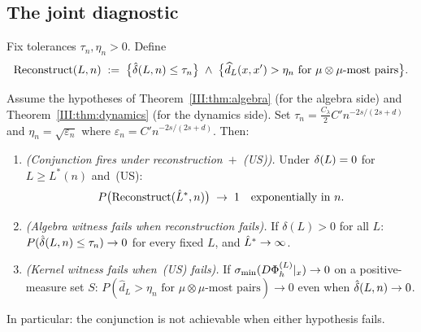 \subsection{The joint diagnostic}

\begin{definition}
\label{III:def:diagnostic}
Fix tolerances $\tau_n, \eta_n > 0$.
Define
\[
  \mathrm{Reconstruct}(L, n)
  \;:=\;
  \bigl\{\hat{\delta}(L,n) \leq \tau_n\bigr\}
  \;\wedge\;
  \bigl\{\widehat{d}_L(x,x') > \eta_n
    \text{ for $\mu \otimes \mu$-most pairs}\bigr\}.
\]
\end{definition}

\begin{theorem}
\label{III:thm:conjunction}
Assume the hypotheses of Theorem~\ref{III:thm:algebra} (for the algebra side)
and Theorem~\ref{III:thm:dynamics} (for the dynamics side).
Set $\tau_n = \frac{C_\lambda}{2} C' n^{-2s/(2s+d)}$ and
$\eta_n = \sqrt{\varepsilon_n}$ where $\varepsilon_n = C' n^{-2s/(2s+d)}$.
Then:
\begin{enumerate}[label=(\alph*)]
  \item \emph{(Conjunction fires under reconstruction~$+$~(US)).}
    Under $\delta(L) = 0$ for $L \geq L^*(n)$ and~(US):
    \[
      P\bigl(\mathrm{Reconstruct}(\hat{L}^*, n)\bigr) \;\to\; 1
      \quad\text{exponentially in } n.
    \]
  \item \emph{(Algebra witness fails when reconstruction fails).}
    If $\delta(L) > 0$ for all $L$: $P(\hat{\delta}(L,n) \leq \tau_n) \to 0$
    for every fixed $L$, and $\hat{L}^* \to \infty$.

  \item \emph{(Kernel witness fails when~(US) fails).}
    If $\sigma_{\min}(D\Phi_h^{(L)}|_x) \to 0$ on a positive-measure set $S$:
    $P(\widehat{d}_L > \eta_n \text{ for }\mu\otimes\mu\text{-most pairs}) \to 0$
    even when $\hat{\delta}(L,n) \to 0$.
\end{enumerate}
In particular: the conjunction is not achievable when either hypothesis fails.
\end{theorem}

